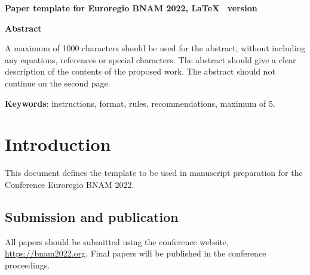 \documentclass[a4paper,11pt]{article}
\begin{document}
\pagestyle{allotherpages}
\thispagestyle{firstpage}
\vspace*{0.65cm} %

\begin{center}
\fontsize{16}{20}\selectfont\bfseries
Paper template for Euroregio BNAM 2022, \LaTeX~ version
\end{center}
\vspace{4pt}
\begin{center}
\vspace{0.5cm}


\end{center}
\textbf{Abstract}

A maximum of 1000 characters should be used for the abstract, without including any equations, references or special characters. The abstract should give a clear description of the contents of the proposed work. The abstract should not continue on the second page.

\textbf{Keywords}: instructions, format, rules, recommendations, maximum of 5.
\section{Introduction}

This document defines the template to be used in manuscript preparation for the Conference Euroregio BNAM 2022.

\subsection{Submission and publication}

All papers should be submitted using the conference website, \href{https://bnam2022.org}{https://bnam2022.org}. Final papers will be published in the conference proceedings.
\end{document}

